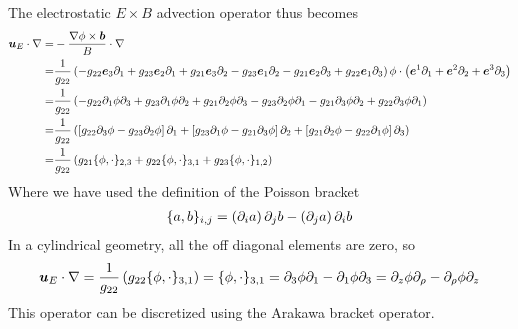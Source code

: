 %
The electrostatic $E\times B$ advection operator thus becomes
%
\begin{align*}
    \boldsymbol{u}_E\cdot\nabla
    =& -\frac{\nabla\phi\times\boldsymbol{b}}{B}\cdot\nabla\\
    =&\frac{1}{g_{22}}
           \left(
           - g_{22}\boldsymbol{e}_3\partial_1
           + g_{23}\boldsymbol{e}_2\partial_1
           + g_{21}\boldsymbol{e}_3\partial_2
           - g_{23}\boldsymbol{e}_1\partial_2
           - g_{21}\boldsymbol{e}_2\partial_3
           + g_{22}\boldsymbol{e}_1\partial_3
           \right)
           \phi
       \cdot\left(\boldsymbol{e}^1\partial_1 + \boldsymbol{e}^2\partial_2 + \boldsymbol{e}^3\partial_3\right)\\
    =& \frac{1}{g_{22}}
           \left(
           - g_{22}\partial_1\phi\partial_3
           + g_{23}\partial_1\phi\partial_2
           + g_{21}\partial_2\phi\partial_3
           - g_{23}\partial_2\phi\partial_1
           - g_{21}\partial_3\phi\partial_2
           + g_{22}\partial_3\phi\partial_1
           \right)\\
    =& \frac{1}{g_{22}}
           \left(
             \left[
               g_{22}\partial_3\phi
             - g_{23}\partial_2\phi
             \right]\partial_1
           +
             \left[
               g_{23}\partial_1\phi
             - g_{21}\partial_3\phi
             \right]\partial_2
           +
             \left[
               g_{21}\partial_2\phi
             - g_{22}\partial_1\phi
             \right]\partial_3
           \right)\\
    =& \frac{1}{g_{22}}
               \left(
                 g_{21}\{\phi, \cdot\}_{2,3}
                 +
                 g_{22}\{\phi, \cdot\}_{3,1}
                 +
                 g_{23}\{\phi, \cdot\}_{1,2}
               \right)
\end{align*}
%
Where we have used the definition of the Poisson bracket
%
\begin{align*}
    \{a, b\}_{i,j} =
      \left(\partial_i a\right) \partial_j b
    - \left(\partial_j a\right) \partial_i b
\end{align*}
%
In a cylindrical geometry, all the off diagonal elements are zero, so
%
\begin{align}
    \boldsymbol{u}_E\cdot\nabla
    = \frac{1}{g_{22}} \left( g_{22}\{\phi, \cdot\}_{3,1} \right)
    = \{\phi, \cdot\}_{3,1}
    = \partial_3\phi\partial_1 - \partial_1\phi\partial_3
    = \partial_z\phi\partial_\rho - \partial_\rho\phi\partial_z
    \label{poi:def}
\end{align}
%
This operator can be discretized using the Arakawa bracket operator.
